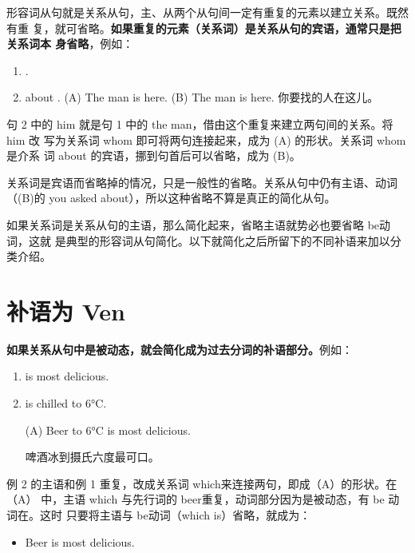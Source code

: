 形容词从句就是关系从句，主、从两个从句间一定有重复的元素以建立关系。既然有重
复，就可省略。\textbf{如果重复的元素（关系词）是关系从句的宾语，通常只是把关系词本
  身省略}，例如：

\begin{enumerate}
\item {}  .
\item {}  about .
\reitem (A) The man  is here.
\reitem (B) The man  is here.
你要找的人在这儿。
\end{enumerate}
句 2 中的 him 就是句 1 中的 the man，借由这个重复来建立两句间的关系。将him 改
写为关系词 whom 即可将两句连接起来，成为 (A) 的形状。关系词 whom是介系
词 about 的宾语，挪到句首后可以省略，成为 (B)。

关系词是宾语而省略掉的情况，只是一般性的省略。关系从句中仍有主语、动词
（(B)的 you asked about），所以这种省略不算是真正的简化从句。

如果关系词是关系从句的主语，那么简化起来，省略主语就势必也要省略 be动词，这就
是典型的形容词从句简化。以下就简化之后所留下的不同补语来加以分类介绍。

\section{补语为 Ven}

\textbf{如果关系从句中是被动态，就会简化成为过去分词的补语部分。}例如：
\begin{enumerate}
\item {} is most delicious.
\item {} is chilled to 6°C.

  \reitem (A) Beer  to 6°C is most delicious.

  啤酒冰到摄氏六度最可口。
\end{enumerate}
例 2 的主语和例 1 重复，改成关系词 which来连接两句，即成（A）的形状。在（A）
中，主语 which 与先行词的 beer重复，动词部分因为是被动态，有 be 动词在。这时
只要将主语与 be动词（which is）省略，就成为：
\begin{itemize}
\item Beer  is most delicious.
\end{itemize}

